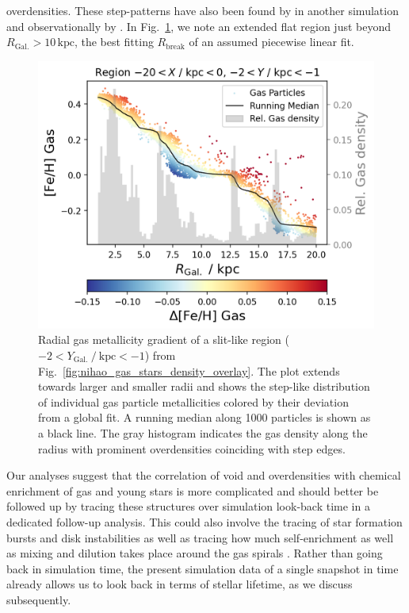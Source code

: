 \documentclass[fleqn,usenatbib]{mnras}
\begin{document}
overdensities. These step-patterns have also been found by \citet{Grand2015} in another simulation and observationally by \citet{Ho2017c}. In Fig.~\ref{fig:region_r_feh_gas_density}, we note an extended flat region just beyond $R_\mathrm{Gal.} > 10\,\mathrm{kpc}$, the best fitting $R_\mathrm{break}$ of an assumed piecewise linear fit.

\begin{figure}
    \centering
    \includegraphics[width=\columnwidth]{figures/region_r_feh_gas_density.png}
    \caption{Radial gas metallicity gradient of a slit-like region ($-2 < Y_\mathrm{Gal.}~/~\mathrm{kpc} < -1$) from Fig.~\ref{fig:nihao_gas_stars_density_overlay}. The plot extends towards larger and smaller radii and shows the step-like distribution of individual gas particle metallicities colored by their deviation from a global fit. A running median along 1000 particles is shown as a black line. The gray histogram indicates the gas density along the radius with prominent overdensities coinciding with step edges.}
    \label{fig:region_r_feh_gas_density}
\end{figure}

Our analyses suggest that the correlation of void and overdensities with chemical enrichment of gas and young stars is more complicated and should better be followed up by tracing these structures over simulation look-back time in a dedicated follow-up analysis. This could also involve the tracing of star formation bursts and disk instabilities \citep{Sanchez2014, SanchezBlazquez2014, Ho2015} as well as tracing how much self-enrichment as well as mixing and dilution takes place around the gas spirals \citep{Ho2017c}. Rather than going back in simulation time, the present simulation data of a single snapshot in time already allows us to look back in terms of stellar lifetime, as we discuss subsequently.
\end{document}
